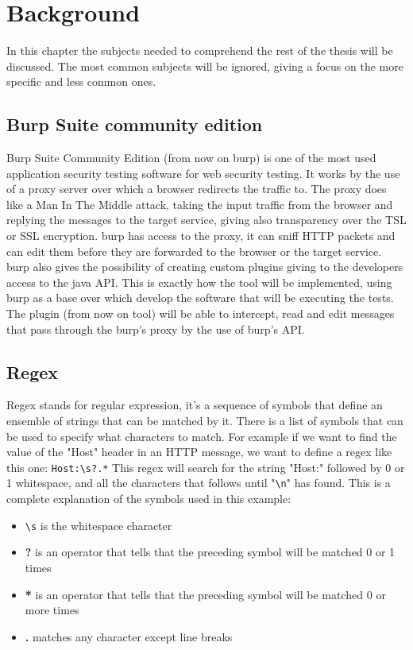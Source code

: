 \printglossary

\chapter{Background}
In this chapter the subjects needed to comprehend the rest of the thesis will be discussed. The most common subjects will be ignored, giving a focus on the more specific and less common ones.

\section{Burp Suite community edition}
Burp Suite Community Edition (from now on \Gls{burp}) is one of the most used application security testing software for web security testing. It works by the use of a proxy server over which a browser redirects the traffic to. The proxy does like a Man In The Middle attack, taking the input traffic from the browser and replying the messages to the target service, giving also transparency over the TSL or SSL encryption. \Gls{burp} has access to the proxy, it can sniff HTTP packets and can edit them before they are forwarded to the browser or the target service. \Gls{burp} also gives the possibility of creating custom plugins giving to the developers access to the java API. This is exactly how the tool will be implemented, using \Gls{burp} as a base over which develop the software that will be executing the tests. The plugin (from now on tool) will be able to intercept, read and edit messages that pass through the \Gls{burp}'s proxy by the use of \Gls{burp}'s API.

\section{Regex}
Regex stands for regular expression, it's a sequence of symbols that define an ensemble of strings that can be matched by it. There is a list of symbols that can be used to specify what characters to match. For example if we want to find the value of the "Host" header in an HTTP message, we want to define a regex like this one: \verb|Host:\s?.*|
This regex will search for the string "Host:" followed by 0 or 1 whitespace, and all the characters that follows until "\verb|\n|" has found. This is a complete explanation of the symbols used in this example:
\begin{itemize}
    \item \verb|\s| is the whitespace character
    \item \textbf{?} is an operator that tells that the preceding symbol will be matched 0 or 1 times
    \item \textbf{*} is an operator that tells that the preceding symbol will be matched 0 or more times
    \item \textbf{.} matches any character except line breaks
\end{itemize}

